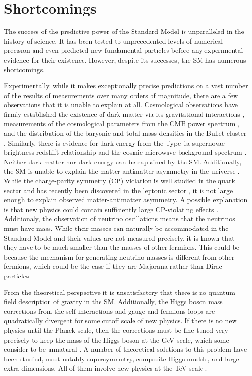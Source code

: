 \section{Shortcomings}

The success
of the predictive power of the Standard Model is unparalleled in the history of science.
It has been tested to unprecedented levels of numerical precision and even predicted new
fundamental particles before any experimental evidence for their existence. However,
despite its successes, the SM has numerous shortcomings.

Experimentally, while it makes exceptionally
precise predictions on a vast number of the results of measurements over many orders
of magnitude, there are a few observations that it is unable to explain at all.
Cosmological observations have firmly established the existence of dark matter via its
gravitational interactions \cite{Zwicky2008, rotation}, measurements of the
cosmological parameters from the CMB power spectrum \cite{Ade:2015}, and the
distribution of the baryonic and total mass densities in the Bullet cluster
\cite{Clowe:2006}. Similarly, there is evidence for dark energy
from the Type 1a supernovae brightness-redshift relationship
\cite{Knop:2003iy} and the cosmic microwave background spectrum \cite{Ade:2015}.
Neither dark matter nor dark energy can be explained by the SM.
Additionally, the SM is unable to explain the matter-antimatter asymmetry in
the universe \cite{sarkar2007particle}. While the charge-parity symmetry (CP)
violation is well studied in the quark sector and has recently been discovered in the
leptonic sector \cite{Abe:2019vii}, it is not large enough to explain observed
matter-antimatter asymmetry. A possible explanation is that new physics
could contain sufficiently large CP-violating effects \cite{Thomson:2013zua}.
Additionaly, the observation of neutrino oscillations means that the neutrinos
must have mass. While their masses can naturally be accommodated in the Standard Model
and their values are not measured precisely, it is known that they have to be much
smaller than the masses of other fermions. This could be because the mechanism
for generating neutrino masses is different from other fermions, which could be the
case if they are Majorana rather than Dirac particles \cite{Thomson:2013zua}.

From the theoretical perspective it is unsatisfactory that there is no quantum
field description of gravity in the SM. Additionally, the Higgs boson mass
corrections from the self interactions and gauge and fermions loops are
quadratically divergent for some cutoff scale of new physics. If there is no new
physics until the Planck scale, then the corrections must be
fine-tuned very precisely to keep the mass of the Higgs boson
at the GeV scale, which some consider to be unnatural \cite{Giudice:2008bi}.
A number of theoretical solutions to this problem have been
studied, most notably supersymmetry, composite Higgs models, and large extra
dimensions. All of them involve new physics at the TeV scale \cite{Schwartz:2013pla}.

